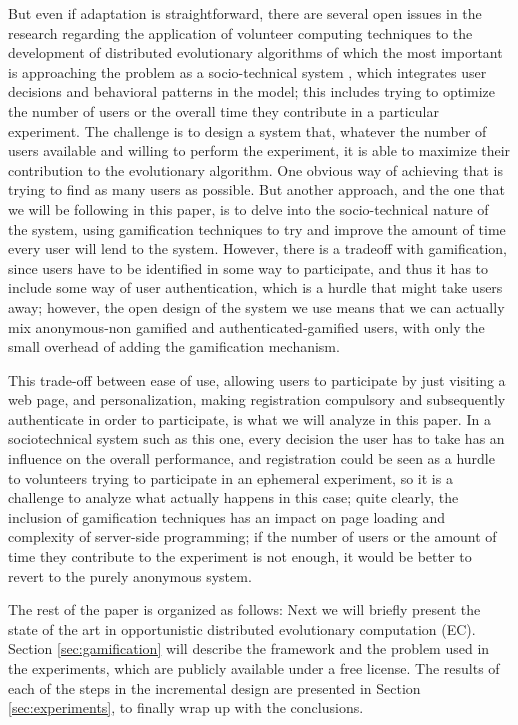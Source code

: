 \documentclass{llncs}
\begin{document}
But even if adaptation is straightforward, there are several open issues in the research regarding the
application of volunteer computing techniques to the development of
distributed evolutionary algorithms of which the most important is
approaching the problem as a socio-technical system
\cite{vespignani2009predicting,merelo2015designing}, which integrates
user decisions and behavioral patterns in the model; this
includes trying to optimize the number of users or the overall time
they contribute in a particular
experiment. The challenge is to design a system that, whatever the
number of users available and willing to perform the experiment, it is able to
maximize their contribution to the evolutionary algorithm. One obvious
way of achieving that is trying to find as many users as possible. But
another approach, and the one that we will be following in this paper, is
to delve into the socio-technical nature of the system, using
gamification techniques to try and improve the amount of time every user will
lend to the system. However, there is a tradeoff with gamification,
since users have to be identified in some way to participate, and thus
it has to include some way of user authentication,
which is a hurdle that might take users away; however, the open design
of the system we use means that we can actually mix anonymous-non
gamified and authenticated-gamified users, with only the small overhead
of adding the gamification mechanism.

This trade-off between ease of use, allowing users to
participate by just visiting a web page, and personalization, making
registration compulsory and subsequently authenticate in order to
participate, is what we will analyze in this paper. In a sociotechnical system such as this one, every
decision the user has to take has an influence on the overall
performance, and registration could be seen as a hurdle to volunteers
trying to participate in an ephemeral experiment, so it is a challenge
to analyze what actually happens in this case; quite clearly, the
inclusion of gamification techniques has an impact on page loading and
complexity of server-side programming; if the number of users
or the amount of time they contribute to the experiment is not enough,
it would be better to revert to the purely anonymous system.

The rest of the paper is organized as follows: Next we will briefly
present the state of the art in opportunistic distributed evolutionary
computation (EC). Section \ref{sec:gamification} will describe the
framework and the problem used in the experiments, which are publicly
available under a free license. The results of each of the steps in the incremental design are presented in Section
\ref{sec:experiments}, to finally wrap up with the conclusions.
\end{document}
